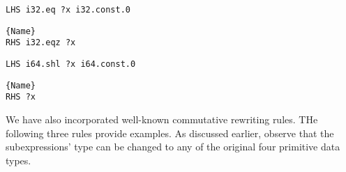 \begin{minipage}{0.95\linewidth}
\begin{minipage}{0.49\linewidth}
    
    \lstset{
    language=ttt,
    style=watcode,
    basicstyle=\footnotesize\ttfamily,
    columns=fullflexible,
    breaklines=true}
    \begin{lstlisting}[]
LHS i32.eq ?x i32.const.0
            \end{lstlisting}\vspace{-0.5cm}
    \noindent\hrulefill
        \lstset{
            language=ttt,
            style=watcode,
            basicstyle=\footnotesize\ttfamily,
            columns=fullflexible,
            breaklines=true}
            \vspace{-0.2cm}
            \begin{lstlisting}[numbers=none]{Name}
RHS i32.eqz ?x
    \end{lstlisting}
\end{minipage}
\begin{minipage}{0.49\linewidth}
    \lstset{
    language=ttt,
    style=watcode,
    basicstyle=\footnotesize\ttfamily,
    columns=fullflexible,
    breaklines=true}
    \begin{lstlisting}[]
LHS i64.shl ?x i64.const.0
            \end{lstlisting}\vspace{-0.5cm}
    \noindent\hrulefill
        \lstset{
            language=ttt,
            style=watcode,
            basicstyle=\footnotesize\ttfamily,
            columns=fullflexible,
            breaklines=true}
            \vspace{-0.2cm}
            \begin{lstlisting}[numbers=none]{Name}
RHS ?x
    \end{lstlisting}
\end{minipage}    
\end{minipage}


We have also incorporated well-known commutative rewriting rules. 
THe following three rules provide examples. 
As discussed earlier, observe that the subexpressions' type can be changed to any of the original four primitive \Wasm data types.

